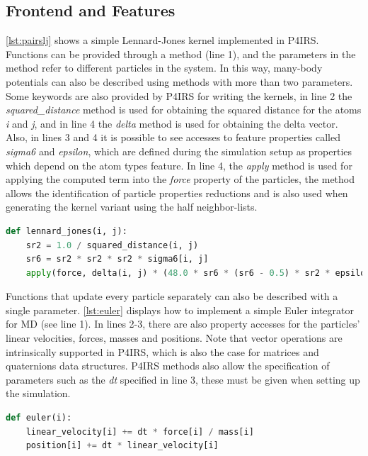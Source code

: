 \documentclass[preprint,12pt]{elsarticle}
\begin{document}
\subsection{Frontend and Features}
\label{sec:frontend}

\autoref{lst:pairslj} shows a simple Lennard-Jones kernel implemented in P4IRS.
Functions can be provided through a method (line 1), and the parameters in the method refer to different particles in the system.
In this way, many-body potentials can also be described using methods with more than two parameters.
Some keywords are also provided by P4IRS for writing the kernels, in line 2 the \emph{squared\_distance} method is used for obtaining the squared distance for the atoms \emph{i} and \emph{j}, and in line 4 the \emph{delta} method is used for obtaining the delta vector.
Also, in lines 3 and 4 it is possible to see accesses to feature properties called \emph{sigma6} and \emph{epsilon}, which are defined during the simulation setup as properties which depend on the atom types feature.
In line 4, the \emph{apply} method is used for applying the computed term into the \emph{force} property of the particles, the method allows the identification of particle properties reductions and is also used when generating the kernel variant using the half neighbor-lists.

\begin{lstlisting}[language=Python,
		   label={lst:pairslj},
		   caption={Lennard-Jones force description in P4IRS.}]
def lennard_jones(i, j):
    sr2 = 1.0 / squared_distance(i, j)
    sr6 = sr2 * sr2 * sr2 * sigma6[i, j]
    apply(force, delta(i, j) * (48.0 * sr6 * (sr6 - 0.5) * sr2 * epsilon[i, j]))
\end{lstlisting}

Functions that update every particle separately can also be described with a single parameter.
\autoref{lst:euler} displays how to implement a simple Euler integrator for \ac{MD} (see line 1).
In lines 2-3, there are also property accesses for the particles' linear velocities, forces, masses and positions.
Note that vector operations are intrinsically supported in P4IRS, which is also the case for matrices and quaternions data structures.
P4IRS methods also allow the specification of parameters such as the \emph{dt} specified in line 3, these must be given when setting up the simulation.

\begin{lstlisting}[language=Python,
		   label={lst:euler},
		   caption={Euler integrator description in P4IRS.}]
def euler(i):
    linear_velocity[i] += dt * force[i] / mass[i]
    position[i] += dt * linear_velocity[i]
\end{lstlisting}
\end{document}
